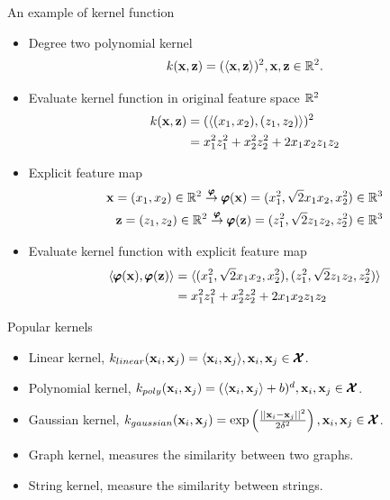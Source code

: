 \documentclass[first=dgreen,second=purple,logo=yellowexc]{aaltoslides}
\begin{document}
{\begin{frame}{An example of kernel function}
	\begin{itemize}
		\item Degree two polynomial kernel
		\begin{align*}
			k(\mathbf {x},\mathbf {z}) = (\langle \mathbf {x}, \mathbf {z} \rangle)^2, \mathbf {x},\mathbf {z}\in\mathbb{R}^2.
		\end{align*} 
		\item Evaluate kernel function in original feature space $\mathbb{R}^2$
		\begin{align*}
			k(\mathbf {x},\mathbf {z}) &= (\langle (x_1,x_2), (z_1,z_2) \rangle)^2 \\
			&= x_1^2z_1^2+x_2^2z_2^2+2x_1x_2z_1z_2 
		\end{align*}
		\item Explicit feature map
		\begin{align*}
			\mathbf {x}=(x_1,x_2)\in\mathbb{R}^2\overset{\pmb \varphi}{\rightarrow}\pmb \varphi(\mathbf {x})=(x_1^2,\sqrt{2}x_1x_2,x_2^2)\in\mathbb{R}^3\\
			\mathbf {z}=(z_1,z_2)\in\mathbb{R}^2\overset{\pmb \varphi}{\rightarrow}\pmb \varphi(\mathbf {z})=(z_1^2,\sqrt{2}z_1z_2,z_2^2)\in\mathbb{R}^3
		\end{align*}
		\item Evaluate kernel function with explicit feature map
		\begin{align*}
			\langle \pmb \varphi(\mathbf {x}), \pmb \varphi(\mathbf {z}) \rangle 
			&= \langle (x_1^2,\sqrt{2}x_1x_2,x_2^2), (z_1^2,\sqrt{2}z_1z_2,z_2^2) \rangle\\
			&= x_1^2z_1^2+x_2^2z_2^2+2x_1x_2z_1z_2
		\end{align*}
		
	\end{itemize}
\end{frame}


\begin{frame}{Popular kernels}
	\begin{itemize}
		\item Linear kernel, $k_{linear}(\mathbf {x}_i,\mathbf {x}_j) = \langle \mathbf {x}_i, \mathbf {x}_j \rangle, \mathbf {x}_i,\mathbf {x}_j\in\pmb {\mathcal{X}}$.
		\item Polynomial kernel, $k_{poly}(\mathbf {x}_i,\mathbf {x}_j) = (\langle \mathbf {x}_i, \mathbf {x}_j \rangle + b)^d, \mathbf {x}_i,\mathbf {x}_j\in\pmb {\mathcal{X}}$.
		\item Gaussian kernel, $k_{gaussian}(\mathbf {x}_i,\mathbf {x}_j) = \exp\left(\frac{||\mathbf {x}_i-\mathbf {x}_j||^2}{2\delta^2}\right), \mathbf {x}_i,\mathbf {x}_j\in\pmb {\mathcal{X}}$.
		\item Graph kernel, measures the similarity between two graphs.
		\item String kernel, measure the similarity between strings.
	\end{itemize}
\end{frame}


}
\end{document}
